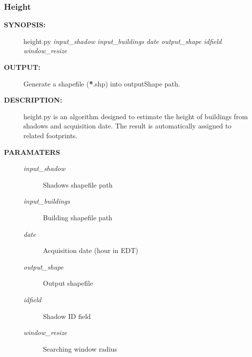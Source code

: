 \documentclass[letterpaper,10pt,english]{sphinxmanual}
\begin{document}
\subsubsection{Height}
\label{user:height}\begin{description}
\item[{\textbf{SYNOPSIS:}}] \leavevmode
height.py \emph{input\_shadow input\_buildings date output\_shape idfield window\_resize}

\item[{\textbf{OUTPUT:}}] \leavevmode
Generate a shapefile ({\color{red}\bfseries{}*}.shp) into outputShape path.

\item[{\textbf{DESCRIPTION:}}] \leavevmode
height.py is an algorithm designed to estimate the height of buildings from shadows and acquisition date. The result is automatically assigned to related footprints.

\item[{\textbf{PARAMATERS}}] \leavevmode\begin{description}
\item[{\emph{input\_shadow}}] \leavevmode
Shadows shapefile path

\item[{\emph{input\_buildings}}] \leavevmode
Building shapefile path

\item[{\emph{date}}] \leavevmode
Acquisition date (hour in EDT)

\item[{\emph{output\_shape}}] \leavevmode
Output shapefile

\item[{\emph{idfield}}] \leavevmode
Shadow ID field

\item[{\emph{window\_resize}}] \leavevmode
Searching window radius

\end{description}

\end{description}
\end{document}
